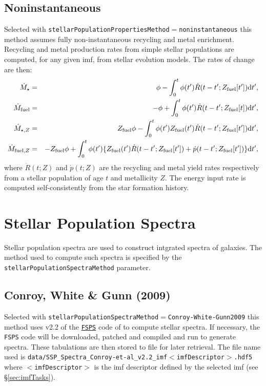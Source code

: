 \subsection{Noninstantaneous}

Selected with {\tt stellarPopulationPropertiesMethod}$=${\tt noninstantaneous} this method assumes fully non-instantaneous recycling and metal enrichment. Recycling and metal production rates from simple stellar populations are computed, for any given \gls{imf}, from stellar evolution models. The rates of change are then:
\begin{eqnarray}
 \dot{M}_\star &=& \phi - \int_0^t \phi(t^\prime) \dot{R}(t-t^\prime;Z_{\rm fuel}[t^\prime]) \d t^\prime, \\
 \dot{M}_{\rm fuel} &=& -\phi + \int_0^t \phi(t^\prime) \dot{R}(t-t^\prime;Z_{\rm fuel}[t]) \d t^\prime, \\
 \dot{M}_{\star,Z} &=& Z_{\rm fuel} \phi - \int_0^t \phi(t^\prime) Z_{\rm fuel}(t^\prime)  \dot{R}(t-t^\prime;Z_{\rm fuel}[t^\prime]) \d t^\prime, \\
 \dot{M}_{{\rm fuel},Z} &=& -Z_{\rm fuel} \phi + \int_0^t  \phi(t^\prime) \{ Z_{\rm fuel}(t^\prime) \dot{R}(t-t^\prime;Z_{\rm fuel}[t^\prime]) + \dot{p}(t-t^\prime;Z_{\rm fuel}[t^\prime]) \} \d t^\prime, \\
\end{eqnarray}
where $\dot{R}(t;Z)$ and $\dot{p}(t;Z)$ are the recycling and metal yield rates respectively from a stellar population of age $t$ and metallicity $Z$. The energy input rate is computed self-consistently from the star formation history.

\section{Stellar Population Spectra}

Stellar population spectra are used to construct intgrated spectra of galaxies. The method used to compute such spectra is specified by the {\tt stellarPopulationSpectraMethod} parameter.

\subsection{Conroy, White \& Gunn (2009)}

Selected with {\tt stellarPopulationSpectraMethod}$=${\tt Conroy-White-Gunn2009} this method uses v2.2 of the \href{http://www.cfa.harvard.edu/~cconroy/FSPS.html}{{\tt FSPS}} code of \cite{conroy_propagation_2009} to compute stellar spectra. If necessary, the {\tt FSPS} code will be downloaded, patched and compiled and run to generate spectra. These tabulations are then stored to file for later retrieval. The file name used is {\tt data/SSP\_Spectra\_Conroy-et-al\_v2.2\_imf$<$imfDescriptor$>$.hdf5} where $<${\tt imfDescriptor}$>$ is the \gls{imf} descriptor defined by the selected \gls{imf} (see \S\ref{sec:imfTasks}).

